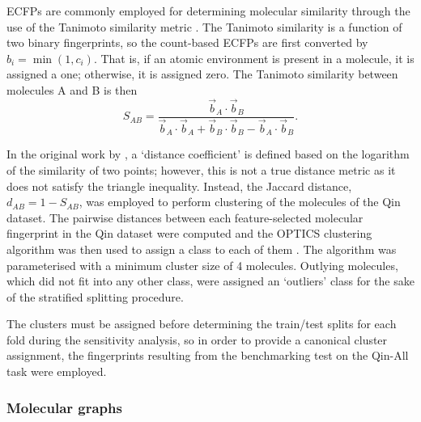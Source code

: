 ECFPs are commonly employed for determining molecular similarity through the use
of the Tanimoto similarity metric
\cite{tanimotoElementaryMathematicalTheory1958,bajuszWhyTanimotoIndex2015,butinaUnsupervisedDataBase1999}.
The Tanimoto similarity is a function of two binary fingerprints, so the
count-based ECFPs are first converted by $b_i = \min (1, c_i)$. That is, if an
atomic environment is present in a molecule, it is assigned a one; otherwise, it
is assigned zero. The Tanimoto similarity between molecules A and B is then
\begin{equation}
    S_{AB} = \frac{\vec{b}_A \cdot \vec{b}_B}{\vec{b}_A \cdot \vec{b}_A + \vec{b}_B \cdot \vec{b}_B - \vec{b}_A \cdot \vec{b}_B}.
\end{equation}

In the original work by \citet{tanimotoElementaryMathematicalTheory1958}, a
`distance coefficient' is defined based on the logarithm of the similarity of
two points; however, this is not a true distance metric as it does not satisfy
the triangle inequality. Instead, the Jaccard distance, $d_{AB} = 1 - S_{AB}$,
was employed to perform clustering of the molecules of the Qin dataset. The
pairwise distances between each feature-selected molecular fingerprint in the
Qin dataset were computed and the OPTICS clustering algorithm was then used to
assign a class to each of them \cite{ankerstOPTICSOrderingPoints1999}. The
algorithm was parameterised with a minimum cluster size of 4 molecules. Outlying
molecules, which did not fit into any other class, were assigned an `outliers'
class for the sake of the stratified splitting procedure.

The clusters must be assigned before determining the train/test splits for each
fold during the sensitivity analysis, so in order to provide a canonical cluster
assignment, the fingerprints resulting from the benchmarking test on the Qin-All
task were employed.

\subsubsection{Molecular graphs}


